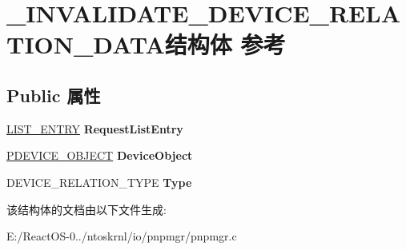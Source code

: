 \hypertarget{struct___i_n_v_a_l_i_d_a_t_e___d_e_v_i_c_e___r_e_l_a_t_i_o_n___d_a_t_a}{}\section{\+\_\+\+I\+N\+V\+A\+L\+I\+D\+A\+T\+E\+\_\+\+D\+E\+V\+I\+C\+E\+\_\+\+R\+E\+L\+A\+T\+I\+O\+N\+\_\+\+D\+A\+T\+A结构体 参考}
\label{struct___i_n_v_a_l_i_d_a_t_e___d_e_v_i_c_e___r_e_l_a_t_i_o_n___d_a_t_a}
\subsection*{Public 属性}
\begin{DoxyCompactItemize}
\item 
\mbox{\label{struct___i_n_v_a_l_i_d_a_t_e___d_e_v_i_c_e___r_e_l_a_t_i_o_n___d_a_t_a_a962397d3b11176b1ad4a72ca16582074}} 
\hyperlink{struct___l_i_s_t___e_n_t_r_y}{L\+I\+S\+T\+\_\+\+E\+N\+T\+RY} {\bfseries Request\+List\+Entry}
\item 
\mbox{\label{struct___i_n_v_a_l_i_d_a_t_e___d_e_v_i_c_e___r_e_l_a_t_i_o_n___d_a_t_a_a3e9cdc18dd874673db27e18c61529bcf}} 
\hyperlink{struct___d_e_v_i_c_e___o_b_j_e_c_t}{P\+D\+E\+V\+I\+C\+E\+\_\+\+O\+B\+J\+E\+CT} {\bfseries Device\+Object}
\item 
\mbox{\label{struct___i_n_v_a_l_i_d_a_t_e___d_e_v_i_c_e___r_e_l_a_t_i_o_n___d_a_t_a_a7437c76152757aeb9bfa737a62d04ccd}} 
D\+E\+V\+I\+C\+E\+\_\+\+R\+E\+L\+A\+T\+I\+O\+N\+\_\+\+T\+Y\+PE {\bfseries Type}
\end{DoxyCompactItemize}


该结构体的文档由以下文件生成\+:\begin{DoxyCompactItemize}
\item 
E\+:/\+React\+O\+S-\/0../ntoskrnl/io/pnpmgr/pnpmgr.\+c\end{DoxyCompactItemize}
